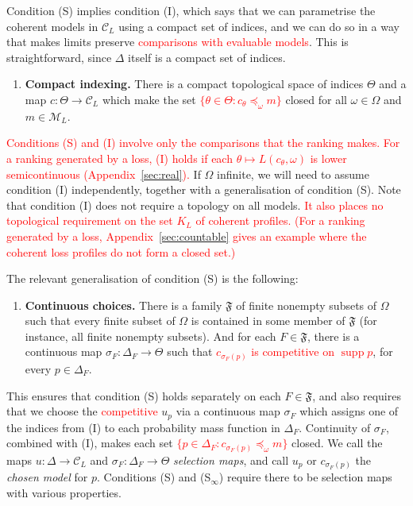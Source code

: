 \documentclass[11pt]{article}
\theoremstyle{definition}
\theoremstyle{remark}
\newcommand{\M}{\mathcal M}
\newcommand{\C}{\mathcal C}
\newcommand{\F}{\mathfrak F}
\newcommand{\supp}{\operatorname{supp}}
\begin{document}
Condition (S) implies condition (I), which says that we can parametrise the coherent models in $\C_L$ using a compact set of indices, and we can do so in a way that makes limits preserve \textcolor{red}{comparisons with evaluable models}. This is straightforward, since $\Delta$ itself is a compact set of indices.
\begin{enumerate}[label=\textbf{(I)},leftmargin=*]
\item \textbf{Compact indexing.} There is a compact topological space of indices $\Theta$ and a map $c:\Theta\to\C_L$ which make the set \textcolor{red}{$\{\theta\in\Theta:c_\theta\preceq_\omega m\}$} closed for all $\omega\in\Omega$ and $m\in\M_L$.
\end{enumerate}
\textcolor{red}{Conditions (S) and (I) involve only the comparisons that the ranking makes. For a ranking generated by a loss, (I) holds if each $\theta\mapsto L(c_\theta,\omega)$ is lower semicontinuous (Appendix~\ref{sec:real}).}
If $\Omega$ infinite, we will need to assume condition (I) independently, together with a generalisation of condition (S). Note that condition (I) does not require a topology on all models. \textcolor{red}{It also places no topological requirement on the set $K_L$ of coherent profiles. (For a ranking generated by a loss, Appendix~\ref{sec:countable} gives an example where the coherent loss profiles do not form a closed set.)} 


The relevant generalisation of condition (S) is the following:
\begin{enumerate}[label=\textbf{(S$_\infty$)},leftmargin=*]
\item \textbf{Continuous choices.} There is a family $\F$ of finite nonempty subsets of $\Omega$ such that every finite subset of $\Omega$ is contained in some member of $\F$ (for instance, all finite nonempty subsets). And for each $F\in\F$, there is a continuous map $\sigma_F:\Delta_F\to\Theta$ such that \textcolor{red}{$c_{\sigma_F(p)}$ is competitive on $\supp p$}, for every $p\in\Delta_F$.
\end{enumerate}

This ensures that condition (S) holds separately on each $F\in\F$, and also requires that we choose the \textcolor{red}{competitive} $u_p$ via a continuous map $\sigma_F$ which assigns one of the indices from (I) to each probability mass function in $\Delta_F$. Continuity of $\sigma_F$, combined with (I), makes each set \textcolor{red}{$\{p\in\Delta_F:c_{\sigma_F(p)}\preceq_\omega m\}$} closed. We call the maps $u:\Delta\to\C_L$ and $\sigma_F:\Delta_F\to\Theta$ \emph{selection maps}, and call $u_p$ or $c_{\sigma_F(p)}$ the \emph{chosen model} for $p$. Conditions (S) and (S$_\infty$) require there to be selection maps with various properties.
\end{document}
